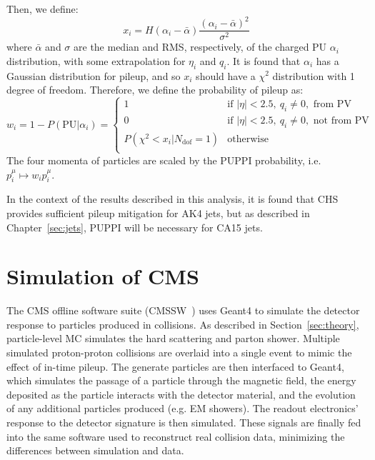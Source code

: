 Then, we define:
\begin{equation}
    x_i = H(\alpha_i - \bar\alpha) \frac{(\alpha_i - \bar\alpha)^2}{\sigma^2}
\end{equation}
where $\bar\alpha$ and $\sigma$ are the median and RMS, respectively, of the charged PU $\alpha_i$ distribution, with some extrapolation for $\eta_i$ and $q_i$.
It is found that $\alpha_i$ has a Gaussian distribution for pileup, and so $x_i$ should have a $\chi^2$ distribution with 1 degree of freedom.
Therefore, we define the probability of pileup as:
\begin{equation}
w_i = 1 - P(\mathrm{PU}|\alpha_i) = 
    \begin{cases}
        1 & \text{if }|\eta|<2.5,~q_i \neq 0, \text{ from PV} \\ 
        0 & \text{if }|\eta|<2.5,~q_i \neq 0, \text{ not from PV} \\ 
        P(\chi^2<x_i | N_\mathrm{dof}=1)  & \text{otherwise} \\ 
    \end{cases}
\end{equation}
The four momenta of particles are scaled by the PUPPI probability, i.e. $p_i^\mu \mapsto w_i p_i^\mu$.

In the context of the results described in this analysis, it is found that CHS provides sufficient pileup mitigation for AK4 jets, but as described in Chapter~\ref{sec:jets}, PUPPI will be necessary for CA15 jets. 

\section{Simulation of CMS}
\label{sec:cms:sim}

The CMS offline software suite (CMSSW~\cite{cmssw}) uses Geant4 \cite{geant1,geant2} to simulate the detector response to particles produced in collisions. 
As described in Section~\ref{sec:theory}, particle-level MC simulates the hard scattering and  parton shower.
Multiple simulated proton-proton collisions are overlaid into a single event to mimic the effect of in-time pileup. 
The generate particles are then interfaced to Geant4, which simulates the passage of a particle through the magnetic field, the energy deposited as the particle interacts with the detector material, and the evolution of any additional particles produced (e.g. EM showers).
The readout electronics' response to the detector signature is then simulated.
These signals are finally fed into the same software used to reconstruct real collision data, minimizing the differences between simulation and data. 

